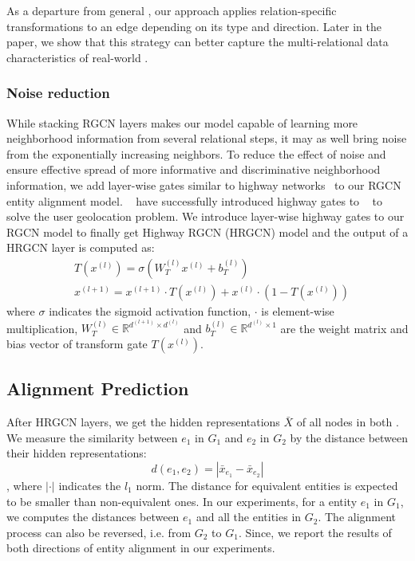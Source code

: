 As a departure from general \GCNs, our approach applies relation-specific transformations to an edge depending on its type and direction.
Later in the paper, we show that this strategy can better capture the multi-relational data characteristics of real-world \KGs. 

	
	


	\subsubsection{Noise reduction}
	\label{section:hgcn}
	While stacking RGCN layers makes our model capable of learning more neighborhood information from several relational steps, it may as
well bring noise from the exponentially increasing neighbors. To reduce the effect of noise and ensure effective spread of more informative
and discriminative neighborhood information, we add layer-wise gates similar to highway networks~\cite{Srivastava2015Highway} to our RGCN
entity alignment model. ~\cite{Rahimi2018Semi} have successfully introduced highway gates to \GCNs~\cite{Kipf2016Semi} to solve the user
geolocation problem. We introduce layer-wise highway gates to our RGCN model to finally get Highway RGCN (HRGCN) model and the output of a
HRGCN layer is computed as:
	\begin{equation}
	\begin{split}
	&T(x^{(l)})=\sigma(W_T^{(l)}x^{(l)}+b_T^{(l)}) \\
	&x^{(l+1)}=x^{(l+1)} \cdot T(x^{(l)})+x^{(l)} \cdot (1-T(x^{(l)}))
	\end{split}
	\end{equation}
	where $\sigma$ indicates the sigmoid activation function, $\cdot$ is element-wise multiplication, $W_T^{(l)} \in \mathbb{R}^{d^{(l+1)} \times d^{(l)}}$ and $b_T^{(l)} \in \mathbb{R}^{d^{(l)} \times 1}$ are the weight matrix and bias vector of transform gate $T(x^{(l)})$.
	
	\subsection{Alignment Prediction}
	After HRGCN layers, we get the hidden representations $\bar{X}$ of all nodes in both \KGs. We measure the similarity between $e_1$ in $G_1$ and $e_2$ in $G_2$ by the distance between their hidden representations:
	\begin{equation}
	\label{d}
	d(e_1,e_2)=|\bar{x}_{e_1}-\bar{x}_{e_2}|
	\end{equation}
	, where $|\cdot|$ indicates the $l_1$ norm. The distance for equivalent entities is expected to be smaller than non-equivalent ones. In our experiments, for a entity $e_1$ in $G_1$, we computes the distances between $e_1$ and all the entities in $G_2$. The alignment process can also be reversed, i.e. from $G_2$ to $G_1$. Since, we report the results of both directions of entity alignment in our experiments.
	
